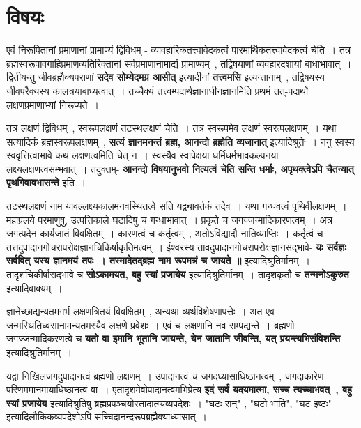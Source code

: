 \section{विषयः}
	एवं निरूपितानां प्रमाणानां प्रामाण्यं द्विविधम् - व्यावहारिकतत्त्वावेदकत्वं पारमार्थिकतत्त्वावेदकत्वं चेति~। तत्र ब्रह्मस्वरूपावगाहिप्रमाणव्यतिरिक्तानां सर्वप्रमाणानामाद्यं प्रामाण्यम्~, तद्विषयाणां व्यवहारदशायां बाधाभावात्~। द्वितीयन्तु जीवब्रह्मैक्यपराणां {\bfseries सदेव सोम्येदमग्र आसीत्} इत्यादीनां {\bfseries तत्त्वमसि} इत्यन्तानाम्~, तद्विषयस्य जीवपरैक्यस्य कालत्रयाबाध्यत्वात्~। तच्चैक्यं तत्त्वम्पदार्थज्ञानाधीनज्ञानमिति प्रथमं तत्-पदार्थो लक्षणप्रमाणाभ्यां निरूप्यते~।\par
	तत्र लक्षणं द्विविधम्~, स्वरूपलक्षणं तटस्थलक्षणं चेति~। तत्र स्वरूपमेव लक्षणं स्वरूपलक्षणम्~। यथा सत्यादिकं ब्रह्मस्वरूपलक्षणम्~, {\bfseries सत्यं ज्ञानमनन्तं ब्रह्म, आनन्दो ब्रह्मेति व्यजानात्} इत्यादिश्रुतेः~। ननु स्वस्य स्ववृत्तित्वाभावे कथं लक्षणत्वमिति चेत् न~। स्वस्यैव स्वापेक्षया धर्मिधर्मभावकल्पनया लक्ष्यलक्षणत्वसम्भवात्~। तदुक्तम्- {\bfseries आनन्दो विषयानुभवो नित्यत्वं चेति सन्ति धर्माः, अपृथक्त्वेऽपि चैतन्यात् पृथगिवावभासन्ते} इति~।\par
	तटस्थलक्षणं नाम यावल्लक्ष्यकालमनवस्थितत्वे सति यद्व्यावर्तकं तदेव~। यथा गन्धवत्वं पृथिवीलक्षणम्~। महाप्रलये परमाणुषु, उत्पत्तिकाले घटादिषु च गन्धाभावात्~। प्रकृते च जगज्जन्मादिकारणत्वम्~। अत्र जगत्पदेन कार्यजातं विवक्षितम्~। कारणत्वं च कर्तृत्वम्~, अतोऽविद्यादौ नातिव्याप्तिः~। कर्तृत्वं च तत्तदुपादानगोचरापरोक्षज्ञानचिकिर्षाकृतिमत्वम्~। ईश्वरस्य तावदुपादानगोचरापरोक्षज्ञानसद्भावे- {\bfseries यः सर्वज्ञः सर्ववित् यस्य ज्ञानमयं तपः~। तस्मादेतद्ब्रह्म नाम रूपमन्नं च जायते ॥} इत्यादिश्रुतिर्मानम्~। तादृशचिकीर्षासद्भावे च {\bfseries सोऽकामयत, बहु स्यां प्रजायेय} इत्यादिश्रुतिर्मानम्~। तादृशकृतौ च {\bfseries तन्मनोऽकुरुत} इत्यादिवाक्यम्~।\par
	ज्ञानेच्छाद्यन्यतमगर्भं लक्षणत्रितयं विवक्षितम्~, अन्यथा व्यर्थविशेषणापत्तेः~। अत एव जन्मस्थितिध्वंसानामन्यतमस्यैव लक्षणे प्रवेशः~। एवं च लक्षणानि नव सम्पद्यन्ते~। ब्रह्मणो जगज्जन्मादिकरणत्वे च {\bfseries यतो वा इमानि भूतानि जायन्ते, येन जातानि जीवन्ति, यत् प्रयन्त्यभिसंविशन्ति} इत्यादिश्रुतिर्मानम्~।\par
	यद्वा निखिलजगदुपादानत्वं ब्रह्मणो लक्षणम्~। उपादानत्वं च जगदध्यासाधिष्ठानत्वम्~, जगदाकारेण परिणममानमायाधिष्ठानत्वं वा~। एतादृशमेवोपादानत्वमभिप्रेत्य {\bfseries इदं सर्वं यदयमात्मा, सच्च त्यच्चाभवत्~, बहु स्यां प्रजायेय} इत्यादिश्रुतिषु ब्रह्मप्रपञ्चयोस्तादात्म्यव्यपदेशः~। "घटः सन्" , "घटो भाति", "घट इष्टः" इत्यादिलौकिकव्यपदेशोऽपि सच्चिदानन्दरूपब्रह्मैक्याध्यासात्~।\par
